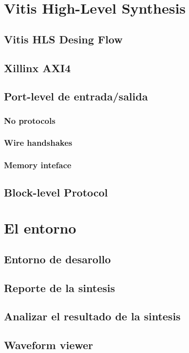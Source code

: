 \documentclass[11pt,spanish,listoffigures,listoftables]{tfgetsinf}
\begin{document}
\chapter{Vitis High-Level Synthesis}
   \section {Vitis HLS Desing Flow} %
   \section {Xillinx AXI4}
   \section {Port-level de entrada/salida}
      \subsection{No protocols}
      \subsection{Wire handshakes}
      \subsection{Memory inteface}
   \section {Block-level Protocol}
\chapter{El entorno}
   \section {Entorno de desarollo} %
   \section {Reporte de la sintesis} %
   \section {Analizar el resultado de la sintesis} %
   \section {Waveform viewer} %
   
\end{document}
